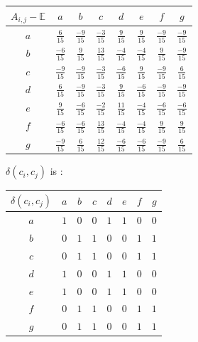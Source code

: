 \documentclass[a4paper, 12pt, twocolumn]{article}
\begin{document}
\begin{center}
       \begin{tabular}{c|ccccccc}
              $ A_{i, j} - \mathbb{E} $ & $ a $ & $ b $ & $ c $ & $ d $ & $ e $ & $ f $ & $ g $ \\
              \hline
              $ a $ & $ \frac{6}{15}  $ & $ \frac{-9}{15} $ & $ \frac{-3}{15} $ & $ \frac{9}{15}  $ & $ \frac{9}{15}  $ & $ \frac{-9}{15} $ & $ \frac{-9}{15} $ \\
              $ b $ & $ \frac{-6}{15} $ & $ \frac{9}{15}  $ & $ \frac{13}{15} $ & $ \frac{-4}{15} $ & $ \frac{-4}{15} $ & $ \frac{9}{15}  $ & $ \frac{-9}{15} $ \\
              $ c $ & $ \frac{-9}{15} $ & $ \frac{-9}{15} $ & $ \frac{-3}{15} $ & $ \frac{-6}{15} $ & $ \frac{9}{15}  $ & $ \frac{-9}{15} $ & $ \frac{6}{15}  $ \\
              $ d $ & $ \frac{6}{15}  $ & $ \frac{-9}{15} $ & $ \frac{-3}{15} $ & $ \frac{9}{15}  $ & $ \frac{-6}{15} $ & $ \frac{-9}{15} $ & $ \frac{-9}{15} $ \\
              $ e $ & $ \frac{9}{15}  $ & $ \frac{-6}{15} $ & $ \frac{-2}{15} $ & $ \frac{11}{15} $ & $ \frac{-4}{15} $ & $ \frac{-6}{15} $ & $ \frac{-6}{15} $ \\
              $ f $ & $ \frac{-6}{15} $ & $ \frac{-6}{15} $ & $ \frac{13}{15} $ & $ \frac{-4}{15} $ & $ \frac{-4}{15} $ & $ \frac{9}{15}  $ & $ \frac{9}{15}  $ \\
              $ g $ & $ \frac{-9}{15} $ & $ \frac{6}{15}  $ & $ \frac{12}{15} $ & $ \frac{-6}{15} $ & $ \frac{-6}{15} $ & $ \frac{-9}{15} $ & $ \frac{6}{15}  $ \\
       \end{tabular}
\end{center}

$ \delta(c_{i}, c_{j}) $ is :

\begin{center}
       \begin{tabular}{c|ccccccc}
              $ \delta(c_{i}, c_{j}) $ & $ a $ & $ b $ & $ c $ & $ d $ & $ e $ & $ f $ & $ g $ \\
              \hline
              $ a $ & $ 1 $ & $ 0 $ & $ 0 $ & $ 1 $ & $ 1 $ & $ 0 $ & $ 0 $ \\
              $ b $ & $ 0 $ & $ 1 $ & $ 1 $ & $ 0 $ & $ 0 $ & $ 1 $ & $ 1 $ \\
              $ c $ & $ 0 $ & $ 1 $ & $ 1 $ & $ 0 $ & $ 0 $ & $ 1 $ & $ 1 $ \\
              $ d $ & $ 1 $ & $ 0 $ & $ 0 $ & $ 1 $ & $ 1 $ & $ 0 $ & $ 0 $ \\
              $ e $ & $ 1 $ & $ 0 $ & $ 0 $ & $ 1 $ & $ 1 $ & $ 0 $ & $ 0 $ \\
              $ f $ & $ 0 $ & $ 1 $ & $ 1 $ & $ 0 $ & $ 0 $ & $ 1 $ & $ 1 $ \\
              $ g $ & $ 0 $ & $ 1 $ & $ 1 $ & $ 0 $ & $ 0 $ & $ 1 $ & $ 1 $ \\
       \end{tabular}
\end{center}
\end{document}

